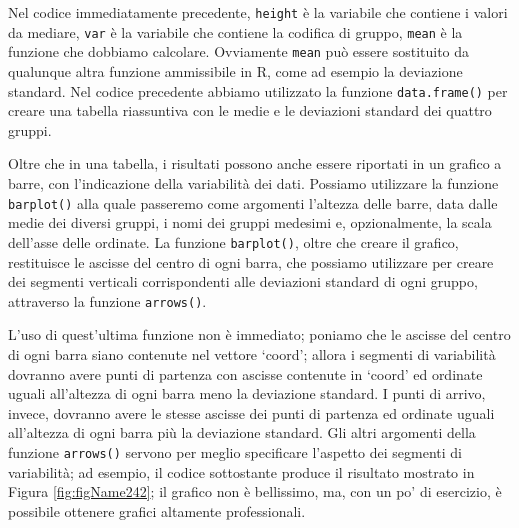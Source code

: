 \documentclass[
  12pt,
]{book}
\newenvironment{Shaded}{\begin{snugshade}}{\end{snugshade}}
\newcommand{\AttributeTok}[1]{\textcolor[rgb]{0.77,0.63,0.00}{#1}}
\newcommand{\DocumentationTok}[1]{\textcolor[rgb]{0.56,0.35,0.01}{\textbf{\textit{#1}}}}
\newcommand{\FunctionTok}[1]{\textcolor[rgb]{0.00,0.00,0.00}{#1}}
\newcommand{\NormalTok}[1]{#1}
\newcommand{\OtherTok}[1]{\textcolor[rgb]{0.56,0.35,0.01}{#1}}
\newcommand{\SpecialCharTok}[1]{\textcolor[rgb]{0.00,0.00,0.00}{#1}}
\begin{document}
\begin{Shaded}
\end{Shaded}

Nel codice immediatamente precedente, \texttt{height} è la variabile che contiene i valori da mediare, \texttt{var} è la variabile che contiene la codifica di gruppo, \texttt{mean} è la funzione che dobbiamo calcolare. Ovviamente \texttt{mean} può essere sostituito da qualunque altra funzione ammissibile in R, come ad esempio la deviazione standard. Nel codice precedente abbiamo utilizzato la funzione \texttt{data.frame()} per creare una tabella riassuntiva con le medie e le deviazioni standard dei quattro gruppi.

Oltre che in una tabella, i risultati possono anche essere riportati in un grafico a barre, con l'indicazione della variabilità dei dati. Possiamo utilizzare la funzione \texttt{barplot()} alla quale passeremo come argomenti l'altezza delle barre, data dalle medie dei diversi gruppi, i nomi dei gruppi medesimi e, opzionalmente, la scala dell'asse delle ordinate. La funzione \texttt{barplot()}, oltre che creare il grafico, restituisce le ascisse del centro di ogni barra, che possiamo utilizzare per creare dei segmenti verticali corrispondenti alle deviazioni standard di ogni gruppo, attraverso la funzione \texttt{arrows()}.

L'uso di quest'ultima funzione non è immediato; poniamo che le ascisse del centro di ogni barra siano contenute nel vettore `coord'; allora i segmenti di variabilità dovranno avere punti di partenza con ascisse contenute in `coord' ed ordinate uguali all'altezza di ogni barra meno la deviazione standard. I punti di arrivo, invece, dovranno avere le stesse ascisse dei punti di partenza ed ordinate uguali all'altezza di ogni barra più la deviazione standard. Gli altri argomenti della funzione \texttt{arrows()} servono per meglio specificare l'aspetto dei segmenti di variabilità; ad esempio, il codice sottostante produce il risultato mostrato in Figura \ref{fig:figName242}; il grafico non è bellissimo, ma, con un po' di esercizio, è possibile ottenere grafici altamente professionali.
\end{document}

